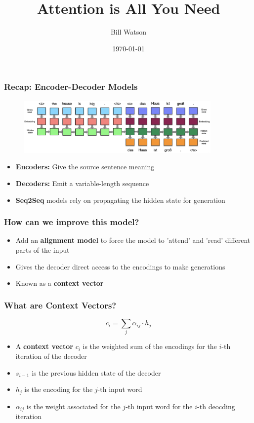 \documentclass[usenames,dvipsnames]{beamer}
\title{Attention is All You Need}
\author{Bill Watson}
\institute{S\&P Global}
\date{\today}
\begin{document}
\begin{frame}
\titlepage
\end{frame}


\begin{frame}
\frametitle{Recap: Encoder-Decoder Models}
\begin{figure}
  \centering
  \includegraphics[width=10cm, valign=c]{assets/enc-dec}
\end{figure}
\begin{itemize}
  \item \textbf{Encoders:} Give the source sentence meaning
  \item \textbf{Decoders:} Emit a variable-length sequence
  \item \textbf{Seq2Seq} models rely on propagating the hidden state for generation
\end{itemize}
\end{frame}

\begin{frame}
\frametitle{How can we improve this model?}
\begin{itemize}
  \item Add an \textbf{alignment model} to force the model to 'attend' and 'read' different parts of the input
  \item Gives the decoder direct access to the encodings to make generations
  \item Known as a \textbf{context vector}
\end{itemize}
\end{frame}

\begin{frame}
\frametitle{What are Context Vectors?}
\begin{equation*}
  c_i = \sum_{j} \alpha_{ij} \cdot h_j
\end{equation*}
\begin{itemize}
  \item A \textbf{context vector} $c_i$ is the weighted sum of the encodings for the $i$-th iteration of the decoder
  \item $s_{i-1}$ is the previous hidden state of the decoder
  \item $h_j$ is the encoding for the $j$-th input word
  \item $\alpha_{ij}$ is the weight associated for the $j$-th input word for the $i$-th deocding iteration
\end{itemize}
\end{frame}
\end{document}
